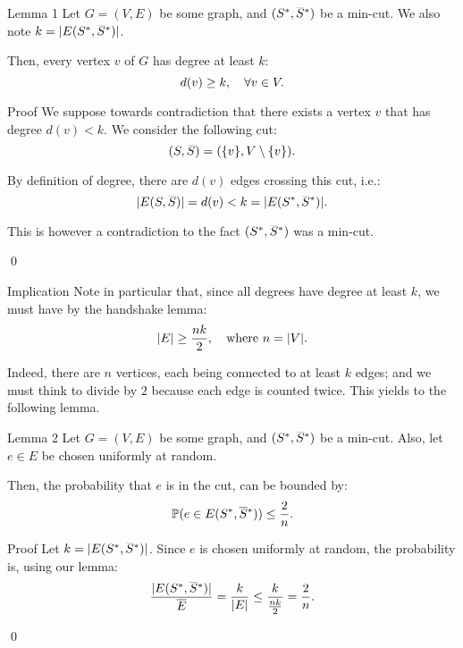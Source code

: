 \documentclass[a4paper]{article}
\begin{document}
\begin{parag}{Lemma 1}
    Let $G = \left(V, E\right)$ be some graph, and $\left(S^*, \smash{\bar{S}}^*\right)$ be a min-cut. We also note $k = \left|E\left(S^*, \smash{\bar{S}}^*\right)\right|$.

    Then, every vertex $v$ of $G$ has degree at least $k$: 
    \[d\left(v\right) \geq k, \mathspace \forall v \in V.\]
    
    \begin{subparag}{Proof}
        We suppose towards contradiction that there exists a vertex $v$ that has degree $d\left(v\right) < k$. We consider the following cut: 
        \[\left(S, \smash{\bar{S}}\right) = \left(\left\{v\right\}, V \setminus \left\{v\right\}\right).\]

        By definition of degree, there are $d\left(v\right)$ edges crossing this cut, i.e.: 
        \[\left|E\left(S, \smash{\bar{S}}\right)\right| = d\left(v\right) < k = \left|E\left(S^*, \smash{\bar{S}}^*\right)\right|.\]

        This is however a contradiction to the fact $\left(S^*, \smash{\bar{S}}^*\right)$ was a min-cut.

        \qed
    \end{subparag}

    \begin{subparag}{Implication}
        Note in particular that, since all degrees have degree at least $k$, we must have by the handshake lemma:
        \[\left|E\right| \geq \frac{nk}{2}, \mathspace \text{where } n = \left|V\right|.\]

        Indeed, there are $n$ vertices, each being connected to at least $k$ edges; and we must think to divide by $2$ because each edge is counted twice. This yields to the following lemma.
    \end{subparag}
\end{parag}

\begin{parag}{Lemma 2}
    Let $G = \left(V, E\right)$ be some graph, and $\left(S^*, \smash{\bar{S}}^*\right)$ be a min-cut. Also, let $e \in E$ be chosen uniformly at random.

    Then, the probability that $e$ is in the cut, can be bounded by: 
    \[\prob\left(e \in E\left(S^*, \smash{\bar{S}}^*\right)\right) \leq \frac{2}{n}.\]

    \begin{subparag}{Proof}
        Let $k = \left|E\left(S^*, \smash{\bar{S}}^*\right)\right|$. Since $e$ is chosen uniformly at random, the probability is, using our lemma: 
        \[\frac{\left|E\left(S^*, \smash{\bar{S}}^*\right)\right|}{\bar{E}} = \frac{k}{\left|E\right|} \leq \frac{k}{\frac{nk}{2}} = \frac{2}{n}.\]

        \qed
    \end{subparag}
\end{parag}
\end{document}
